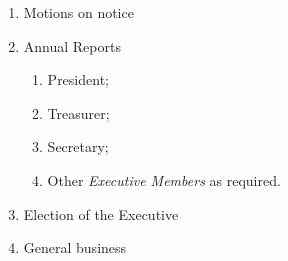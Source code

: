 \documentclass[11pt]{article}
\begin{document}
\begin{enumerate}[\thesection .1]
\begin{enumerate}[\hspace{5mm}1.]
    	\item Motions on notice
    	\item Annual Reports
    	\begin{enumerate}
            \item President;
            \item Treasurer;
            \item Secretary;
            \item Other \textit{Executive Members} as required.
        \end{enumerate}
        \item Election of the Executive
        \item General business
    \end{enumerate}
\end{enumerate}
\end{document}
